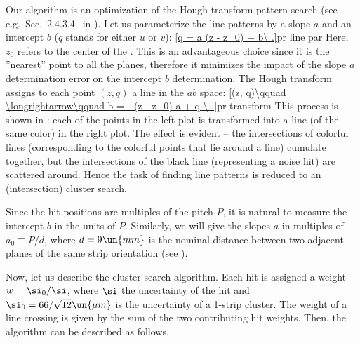 Our algorithm is an optimization of the Hough transform pattern search (see e.g.~Sec.~2.4.3.4.~in ). Let us parameterize the line patterns by a slope $a$ and an intercept $b$ ($q$ stands for either $u$ or $v$):
\eqref{q = a (z - z_0) + b\ .}{pr line par}
Here, $z_0$ refers to the center of the . This is an advantageous choice since it is the ''nearest'' point to all the planes, therefore it minimizes the impact of the slope $a$ determination error on the intercept $b$ determination. The Hough transform assigns to each point $(z, q)$ a line in the $ab$ space:
\eqref{(z, q)\qquad \longrightarrow\qquad b = - (z - z_0) a + q \ .}{pr transform}
This process is shown in : each of the points in the left plot is transformed into a line (of the same color) in the right plot. The effect is evident -- the intersections of colorful lines (corresponding to the colorful points that lie around a line) cumulate together, but the intersections of the black line (representing a noise hit) are scattered around. Hence the task of finding line patterns is reduced to an (intersection) cluster search.

Since the hit positions are multiples of the pitch $P$, it is natural to measure the intercept $b$ in the units of $P$. Similarly, we will give the slopes $a$ in multiples of $a_0 \equiv P / d$, where $d = 9 \un{mm}$ is the nominal distance between two adjacent planes of the same strip orientation (see ).


Now, let us describe the cluster-search algorithm. Each hit is assigned a weight $w = \si_0/\si$, where $\si$ the uncertainty of the hit and $\si_0 = 66/\sqrt{12} \un{\mu m}$ is the uncertainty of a 1-strip cluster. The weight of a line crossing is given by the sum of the two contributing hit weights. Then, the algorithm can be described as follows.

